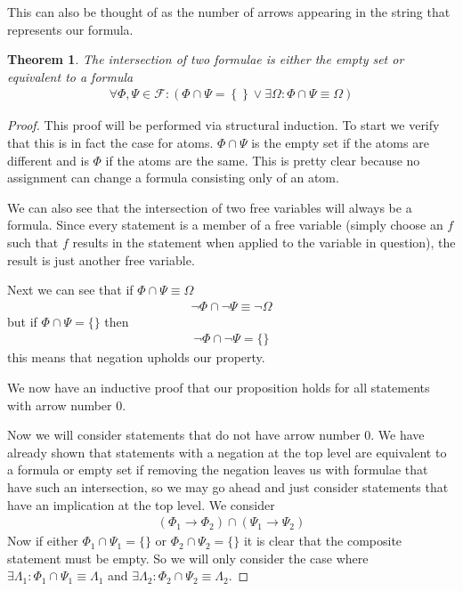 \documentclass{article}
\newtheorem{thm}{Theorem}
\begin{document}
This can also be thought of as the number of arrows appearing in the string that represents our formula.

\begin{thm}
The intersection of two formulae is either the empty set or equivalent to a formula
\begin{align*}
\forall \Phi,\Psi \in \mathcal{F} : \left(\Phi \cap \Psi = \left\{\right\} \lor \exists \Omega : \Phi \cap \Psi \equiv \Omega \right)
\end{align*}
\end{thm}
\begin{proof}
This proof will be performed via structural induction.
To start we verify that this is in fact the case for atoms.
$\Phi \cap \Psi$ is the empty set if the atoms are different and is $\Phi$ if the atoms are the same.
This is pretty clear because no assignment can change a formula consisting only of an atom.

We can also see that the intersection of two free variables will always be a formula.
Since every statement is a member of a free variable (simply choose an $f$ such that $f$ results in the statement when applied to the variable in question),
the result is just another free variable.

Next we can see that if $\Phi \cap \Psi \equiv \Omega$
\begin{align*}
\neg \Phi \cap \neg \Psi \equiv \neg \Omega
\end{align*}
but if $\Phi \cap \Psi = \{\}$ then
\begin{align*}
\neg \Phi \cap \neg \Psi = \{\}
\end{align*}
this means that negation upholds our property.

We now have an inductive proof that our proposition holds for all statements with arrow number $0$.

Now we will consider statements that do not have arrow number $0$.
We have already shown that statements with a negation at the top level are equivalent to a formula or empty set if removing the negation leaves us with formulae that have such an intersection, so we may go ahead and just consider statements that have an implication at the top level.
We consider
\begin{align*}
(\Phi_1 \rightarrow \Phi_2) \cap (\Psi_1 \rightarrow \Psi_2)
\end{align*}
Now if either $\Phi_1 \cap \Psi_1 = \{\}$ or $\Phi_2 \cap \Psi_2 = \{\}$ it is clear that the composite statement must be empty.
So we will only consider the case where $\exists \Lambda_1 : \Phi_1 \cap \Psi_1 \equiv \Lambda_1$ and $\exists \Lambda_2 : \Phi_2 \cap \Psi_2 \equiv \Lambda_2$.


\end{proof}
\end{document}
